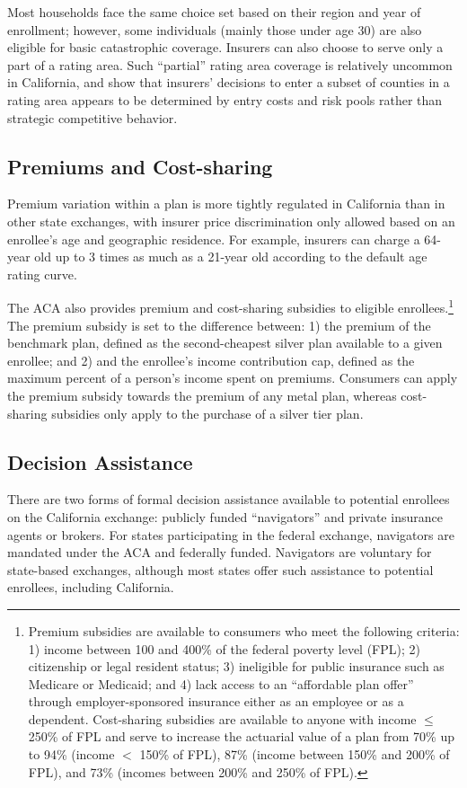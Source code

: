 \documentclass[12pt]{article}
\begin{document}
Most households face the same choice set based on their region and year of enrollment; however, some individuals (mainly those under age 30) are also eligible for basic catastrophic coverage. Insurers can also choose to serve only a part of a rating area. Such ``partial'' rating area coverage is relatively uncommon in California, and \cite{fang2020} show that insurers' decisions to enter a subset of counties in a rating area appears to be determined by entry costs and risk pools rather than strategic competitive behavior.

\subsection{Premiums and Cost-sharing}
Premium variation within a plan is more tightly regulated in California than in other state exchanges, with insurer price discrimination only allowed based on an enrollee's age and geographic residence. For example, insurers can charge a 64-year old up to 3 times as much as a 21-year old according to the default age rating curve.

The ACA also provides premium and cost-sharing subsidies to eligible enrollees.\footnote{Premium subsidies are available to consumers who meet the following criteria: 1) income between 100 and 400\% of the federal poverty level (FPL); 2) citizenship or legal resident status; 3) ineligible for public insurance such as Medicare or Medicaid; and 4) lack access to an ``affordable plan offer'' through employer-sponsored insurance either as an employee or as a dependent. Cost-sharing subsidies are available to anyone with income $\leq$ 250\% of FPL and serve to increase the actuarial value of a plan from 70\% up to 94\% (income $<$ 150\% of FPL), 87\% (income between 150\% and 200\% of FPL), and 73\% (incomes between 200\% and 250\% of FPL).} The premium subsidy is set to the difference between: 1) the premium of the benchmark plan, defined as the second-cheapest silver plan available to a given enrollee; and 2) and the enrollee's income contribution cap, defined as the maximum percent of a person's income spent on premiums. Consumers can apply the premium subsidy towards the premium of any metal plan, whereas cost-sharing subsidies only apply to the purchase of a silver tier plan.

\subsection{Decision Assistance}
There are two forms of formal decision assistance available to potential enrollees on the California exchange: publicly funded ``navigators'' and private insurance agents or brokers. For states participating in the federal exchange, navigators are mandated under the ACA and federally funded. Navigators are voluntary for state-based exchanges, although most states offer such assistance to potential enrollees, including California. 
\end{document}
